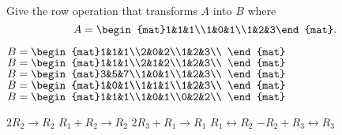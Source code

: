 

\begin{Exercise}[
name={},
title={}, 
difficulty=0,
origin={\cite{GH}}]
Give the row operation that transforms $A$ into $B$ where $$A = \begin{mat}1&1&1\\1&0&1\\1&2&3\end{mat}.$$
\begin{multicols}{2}
\Question $B = \begin{mat}1&1&1\\2&0&2\\1&2&3\\ \end{mat}$
\Question $B = \begin{mat}1&1&1\\2&1&2\\1&2&3\\ \end{mat}$
\Question $B = \begin{mat}3&5&7\\1&0&1\\1&2&3\\ \end{mat}$
\Question $B = \begin{mat}1&0&1\\1&1&1\\1&2&3\\ \end{mat}$
\Question $B = \begin{mat}1&1&1\\1&0&1\\0&2&2\\ \end{mat}$
\EndCurrentQuestion
\end{multicols}
\end{Exercise}

\begin{Answer}
\Question $2R_2\rightarrow R_2$ 
\Question $R_1+R_2\rightarrow R_2$
\Question $2R_3+R_1\rightarrow R_1$
\Question $R_1\leftrightarrow R_2$
\Question $-R_2+R_3\leftrightarrow R_3$

\end{Answer}
